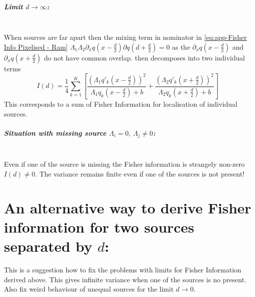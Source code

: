 \subparagraph*{Limit $d\rightarrow\infty$:}\ \\
When sources are far apart then the mixing term in nominator in \autoref{eq:app-Fisher Info Pixelised - Ram} $\Lambda_1\Lambda_2\partial_{x}q(x-\frac{d}{2})\partial q(d+\frac{d}{2})=0$ as the $\partial_{x}q(x-\frac{d}{2})$ and $\partial_{x}q(x+\frac{d}{2})$ do not have common overlap.  then decomposes into two individual terms
%
\begin{equation}
	I(d) 
	=\frac{1}{4}\sum_{k=1}^K\left[\frac{\left(\Lambda_1q'_k(x-\frac{d}{2})\right)^2}{\Lambda_1q_k(x-\frac{d}{2})+b}+\frac{\left(\Lambda_2 q'_k(x+\frac{d}{2})\right)^2}{\Lambda_2q_k(x+\frac{d}{2})+b}\right]
\end{equation}
%
This corresponds to a sum of Fisher Information for localisation of individual sources. 

\subparagraph*{Situation with missing source $\Lambda_i=0,\ \Lambda_j\neq0$:}\ \\
Even if one of the source is missing the Fisher information is strangely non-zero $I(d)\neq0$. The variance remains finite even if one of the sources is not present!


\section{An alternative way to derive Fisher information for two sources separated by $d$:}
\label{sec:Appendix FI alternative}
This is a suggestion how to fix the problems with limits for Fisher Information derived above. This gives infinite variance when one of the sources is no present. Also fix weird behaviour of unequal sources for the limit $d\rightarrow0$. 

